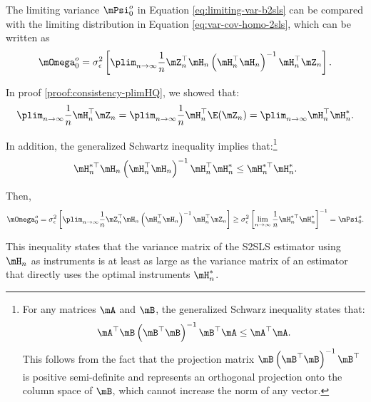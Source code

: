 The limiting variance $\mPsi_0^o$ in Equation \eqref{eq:limiting-var-b2sls} can be compared with the limiting distribution in Equation \eqref{eq:var-cov-homo-2sls}, which can be written as
\begin{equation*}
\mOmega_0^o = \sigma_{\epsilon}^2\left[\plim_{n\to\infty}\frac{1}{n}\mZ^\top_n\mH_n\left(\mH_n^\top\mH_n\right)^{-1}\mH_n^\top\mZ_n\right].
\end{equation*}

In proof \ref{proof:consistency-plimHQ}, we showed that:
\begin{equation*}
\plim_{n\to\infty}\frac{1}{n}\mH_n^\top\mZ_n = \plim_{n\to\infty}\frac{1}{n}\mH_n^\top\E(\mZ_n)=\plim_{n\to\infty}\mH_n^\top\mH_n^*.
\end{equation*}

In addition, the generalized Schwartz inequality implies that:\footnote{For any matrices $\mA$ and $\mB$, the generalized Schwarz inequality states that:
\begin{equation*}
\mA^\top\mB\left(\mB^\top\mB\right)^{-1}\mB^\top\mA\leq \mA^\top\mA.
\end{equation*}
This follows from the fact that the projection matrix $\mB\left(\mB^\top\mB\right)^{-1}\mB^\top$ is positive semi-definite and represents an orthogonal projection onto the column space of $\mB$, which cannot increase the norm of any vector.
}
\begin{equation*}
\mH_n^{*\top}\mH_n\left(\mH_n^\top\mH_n\right)^{-1}\mH_n^\top\mH_n^{*}\leq \mH_n^{*\top}\mH_n^*.
\end{equation*}

Then,
\begin{equation*}
\mOmega_0^o =  \sigma_{\epsilon}^2\left[\plim_{n\to\infty}\frac{1}{n}\mZ^\top_n\mH_n\left(\mH_n^\top\mH_n\right)^{-1}\mH_n^\top\mZ_n\right] \geq \sigma_{\epsilon}^2\left[\lim_{n\to\infty} \frac{1}{n}\mH^{*\top}_n \mH_n^*\right]^{-1} = \mPsi_0^o.
\end{equation*}

This inequality states that the variance matrix of the S2SLS estimator using $\mH_n$ as instruments is at least as large as the variance matrix of an estimator that directly uses the optimal instruments $\mH_n^*$. 

